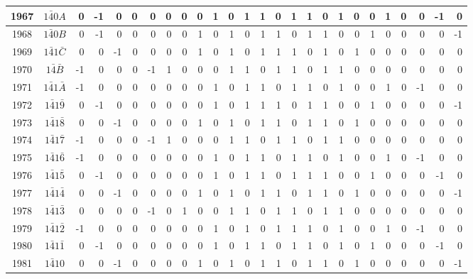 \documentclass[12 pt]{article}%
\begin{document}
\begin{tiny}
\begin{centering}
\begin{longtable}{|c|c||rrrrrrrrrrrrrrrrrrrrrrrr|}
      1967 & $1\bar40A$ & 0 & -1 & 0 & 0 & 0 & 0 & 0 & 0 & 1 & 0 & 1 & 1 & 0 & 1 & 1 & 0 & 1 & 0 & 0 & 1 & 0 & 0 & -1 & 0 \\
      \hline
      1968 & $1\bar40B$ & 0 & -1 & 0 & 0 & 0 & 0 & 0 & 1 & 0 & 1 & 0 & 1 & 1 & 0 & 1 & 1 & 0 & 0 & 1 & 0 & 0 & 0 & 0 & -1 \\
      \hline
      1969 & $1\bar41\bar C$ & 0 & 0 & -1 & 0 & 0 & 0 & 0 & 1 & 0 & 1 & 0 & 1 & 1 & 1 & 0 & 1 & 0 & 1 & 0 & 0 & 0 & 0 & 0 & 0 \\
      \hline
      1970 & $1\bar4\bar B$ & -1 & 0 & 0 & 0 & -1 & 1 & 0 & 0 & 0 & 1 & 1 & 0 & 1 & 1 & 0 & 1 & 1 & 0 & 0 & 0 & 0 & 0 & 0 & 0 \\
      \hline
      1971 & $1\bar41\bar A$ & -1 & 0 & 0 & 0 & 0 & 0 & 0 & 0 & 1 & 0 & 1 & 1 & 0 & 1 & 1 & 0 & 1 & 0 & 0 & 1 & 0 & -1 & 0 & 0 \\
      \hline
      1972 & $1\bar41\bar9$ & 0 & -1 & 0 & 0 & 0 & 0 & 0 & 0 & 1 & 0 & 1 & 1 & 1 & 0 & 1 & 1 & 0 & 0 & 1 & 0 & 0 & 0 & 0 & -1 \\
      \hline
      1973 & $1\bar41\bar8$ & 0 & 0 & -1 & 0 & 0 & 0 & 0 & 1 & 0 & 1 & 0 & 1 & 1 & 0 & 1 & 1 & 0 & 1 & 0 & 0 & 0 & 0 & 0 & 0 \\
      \hline
      1974 & $1\bar41\bar7$ & -1 & 0 & 0 & 0 & -1 & 1 & 0 & 0 & 0 & 1 & 1 & 0 & 1 & 1 & 0 & 1 & 1 & 0 & 0 & 0 & 0 & 0 & 0 & 0 \\
      \hline
      1975 & $1\bar41\bar6$ & -1 & 0 & 0 & 0 & 0 & 0 & 0 & 0 & 1 & 0 & 1 & 1 & 0 & 1 & 1 & 0 & 1 & 0 & 0 & 1 & 0 & -1 & 0 & 0 \\
      \hline
      1976 & $1\bar41\bar5$ & 0 & -1 & 0 & 0 & 0 & 0 & 0 & 0 & 1 & 0 & 1 & 1 & 0 & 1 & 1 & 1 & 0 & 0 & 1 & 0 & 0 & 0 & -1 & 0 \\
      \hline
      1977 & $1\bar41\bar4$ & 0 & 0 & -1 & 0 & 0 & 0 & 0 & 1 & 0 & 1 & 0 & 1 & 1 & 0 & 1 & 1 & 0 & 1 & 0 & 0 & 0 & 0 & 0 & -1 \\
      \hline
      1978 & $1\bar41\bar3$ & 0 & 0 & 0 & 0 & -1 & 0 & 1 & 0 & 0 & 1 & 1 & 0 & 1 & 1 & 0 & 1 & 1 & 0 & 0 & 0 & 0 & 0 & 0 & 0 \\
      \hline
      1979 & $1\bar41\bar2$ & -1 & 0 & 0 & 0 & 0 & 0 & 0 & 0 & 1 & 0 & 1 & 0 & 1 & 1 & 1 & 0 & 1 & 0 & 0 & 1 & 0 & -1 & 0 & 0 \\
      \hline
      1980 & $1\bar41\bar1$ & 0 & -1 & 0 & 0 & 0 & 0 & 0 & 0 & 1 & 0 & 1 & 1 & 0 & 1 & 1 & 0 & 1 & 0 & 1 & 0 & 0 & 0 & -1 & 0 \\
      \hline
      1981 & $1\bar410$ & 0 & 0 & -1 & 0 & 0 & 0 & 0 & 1 & 0 & 1 & 0 & 1 & 1 & 0 & 1 & 1 & 0 & 1 & 0 & 0 & 0 & 0 & 0 & -1 \\

\end{longtable}
\end{centering}
\end{tiny}
\end{document}
